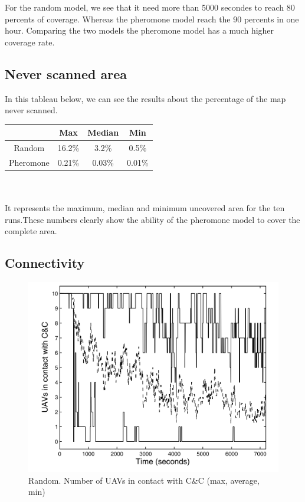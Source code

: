 For the random model, we see that it need more than 5000 secondes to reach 80 percents of coverage. Whereas the pheromone model reach the 90 percents in one hour. Comparing the two models the pheromone model has a much higher coverage rate.
\newpage
\subsection{Never scanned area}

In this tableau below, we can see the results about the percentage of the map never scanned.\\

\begin{tabular}{|c|c|c|c|}
\hline
	      & Max & Median & Min \\
	      \hline
	Random & 16.2\% & 3.2\% & 0.5\% \\
	\hline
	Pheromone & 0.21\% & 0.03\% & 0.01\% \\
	\hline
\end{tabular}
\\\\
It represents  the maximum, median and minimum uncovered area for the ten runs.These numbers  clearly  show  the  ability  of  the  pheromone 
model to cover the complete area. 

\subsection{Connectivity}

\begin{figure}[h]
\caption{\label{randomconnect} Random. Number of UAVs in contact with C\&C (max, average, min)}
   \includegraphics{../images/random_resultat_connectivite.png}
\end{figure}


